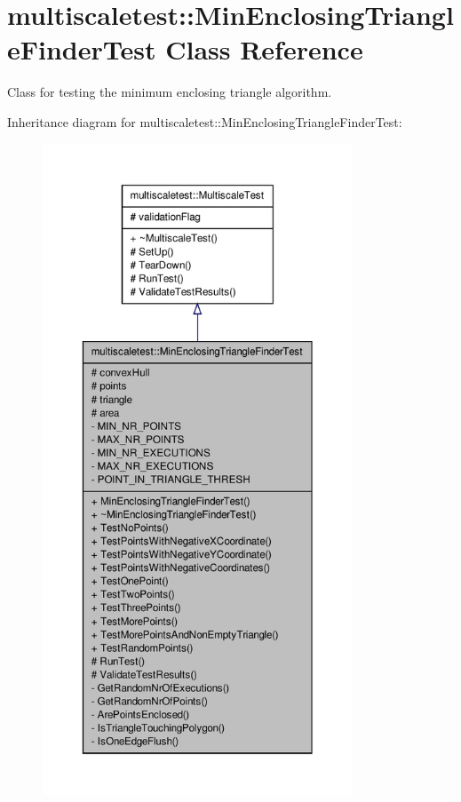 \hypertarget{classmultiscaletest_1_1MinEnclosingTriangleFinderTest}{\section{multiscaletest\-:\-:\-Min\-Enclosing\-Triangle\-Finder\-Test \-Class \-Reference}
\label{classmultiscaletest_1_1MinEnclosingTriangleFinderTest}
}


\-Class for testing the minimum enclosing triangle algorithm.  




\-Inheritance diagram for multiscaletest\-:\-:\-Min\-Enclosing\-Triangle\-Finder\-Test\-:\nopagebreak
\begin{figure}[H]
\begin{center}
\leavevmode
\includegraphics[height=550pt]{classmultiscaletest_1_1MinEnclosingTriangleFinderTest__inherit__graph}
\end{center}
\end{figure}
